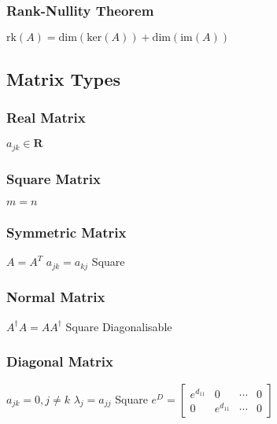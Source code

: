 \subsubsection{Rank-Nullity Theorem}			
\begin{itemize}
\itemt \( \mathrm{rk} (A) = \mathrm{dim} (\mathrm{ker} (A))+\mathrm{dim} (\mathrm{im} (A)) \)
\end{itemize}

\subsection{Matrix Types}

\subsubsection{Real Matrix}			
\begin{itemize}
\itemt \( a_{jk} \in \mathbf{R} \)
\end{itemize}

\subsubsection{Square Matrix}			
\begin{itemize}
\itemt \( m = n \)
\end{itemize}

\subsubsection{Symmetric Matrix}			
\begin{itemize}
\itemt \( A = A^T \)
\itemt \( a_{jk} = a_{kj}\)
\itemt Square
\end{itemize}

\subsubsection{Normal Matrix}			
\begin{itemize}
\itemt \( A^\dagger A = AA^\dagger \)
\itemt Square 
\itemt Diagonalisable
\end{itemize}

\subsubsection{Diagonal Matrix}			
\begin{itemize}
\itemt \( a_{jk} = 0, j \neq k \)
\itemt \( \lambda_j = a_{jj} \)
\itemt Square
\itemt \( e^D = \begin{bmatrix}
e^{d_{11}}	& 0 			& \cdots	& 0	\\
0			& e^{d_{11}}	& \cdots	& 0 
\end{bmatrix}\)
\end{itemize}				

